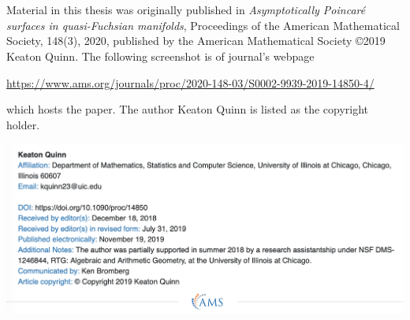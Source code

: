 \appendix



\chapter{}

Material in this thesis was originally published in \emph{Asymptotically Poincaré surfaces in quasi-Fuchsian manifolds}, Proceedings of the American Mathematical Society, 148(3), 2020, published by the American Mathematical Society \copyright 2019 Keaton Quinn.
The following screenshot is of journal's webpage

\begin{center}
\href{https://www.ams.org/journals/proc/2020-148-03/S0002-9939-2019-14850-4/}{https://www.ams.org/journals/proc/2020-148-03/S0002-9939-2019-14850-4/}
\end{center}

\noindent
which hosts the paper. The author Keaton Quinn is listed as the copyright holder. 
\begin{center}
\includegraphics[scale=0.6]{figures/copyright.png}
\end{center}

\thispagestyle{pageonbottom}
